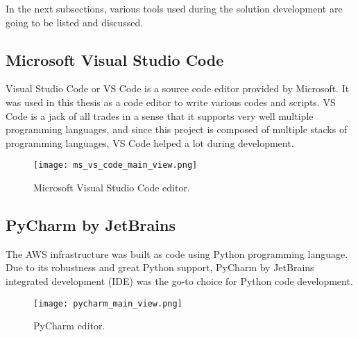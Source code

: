 In the next subsections, various tools used during the solution development are going to be listed and discussed.



\subsection{Microsoft Visual Studio Code}
\label{subsec:ms-visual-studio-code}

Visual Studio Code or VS Code is a source code editor provided by Microsoft. It was used in this thesis as a code editor to write various codes and scripts. VS Code is a jack of all trades in a sense that it supports very well multiple programming languages, and since this project is composed of multiple stacks of programming languages, VS Code helped a lot during development.

\begin{figure}[H]
    \centering \texttt{[image: ms\_vs\_code\_main\_view.png]}
    \caption{Microsoft Visual Studio Code editor.}
    \label{fig:ms-vs-code}
\end{figure}




\subsection{PyCharm by JetBrains}
\label{subsec:pycharm}

The AWS infrastructure was built as code using Python programming language. Due to its robustness and great Python support, PyCharm by JetBrains integrated development (IDE) was the go-to choice for Python code development.

\begin{figure}[H]
    \centering \texttt{[image: pycharm\_main\_view.png]}
    \caption{PyCharm editor.}
    \label{fig:pycharm}
\end{figure}




